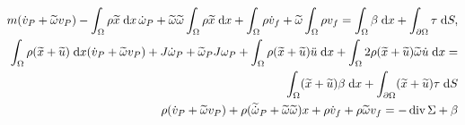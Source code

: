 \documentclass[11t]{article}
\renewcommand{\div}{\operatorname{div}}
\begin{document}
\begin{equation}
\begin{aligned}
m (\dot{{v}}_P + \widetilde{\omega} v_P) - \int_{\Omega} \rho \widetilde{x} \d{x} \, \dot{{\omega}}_P + \widetilde{\omega} \widetilde{\omega} \int_{\Omega} \rho \widetilde{x} \d{x} + \int_{\Omega} \rho \dot{v}_f + \widetilde{\omega} \int_{\Omega} \rho v_f  = \int_{\Omega} \beta \d{x} + \int_{\partial \Omega} \tau \d{S}, \\
\int_{\Omega} \rho (\widetilde{x} + \widetilde{u}) \d{x} (\dot{{v}}_P + \widetilde{\omega} v_P) + J \dot{\omega}_P + \widetilde{\omega}_P J \omega_P + \int_{\Omega} \rho (\widetilde{x} + \widetilde{u}) \ddot{u} \d{x} + \int_{\Omega} 2\rho (\widetilde{x} + \widetilde{u}) \widetilde{\omega} \dot{u} \d{x} = \\
\int_{\Omega}(\widetilde{x} + \widetilde{u}) \beta \d{x} + \int_{\partial \Omega}(\widetilde{x} + \widetilde{u}) \tau \d{S} \\
\rho (\dot{{v}}_P + \widetilde{\omega} v_P) + \rho (\widetilde{\dot{{\omega}}}_P + \widetilde{\omega}\widetilde{\omega})x + \rho \dot{v}_f + \rho \widetilde{\omega} v_f = - \div{\Sigma} + \beta
\end{aligned}
\end{equation}






 
\end{document}
